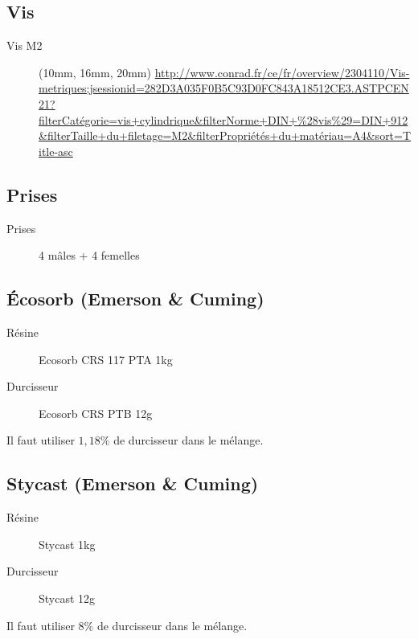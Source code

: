

\subsection{Vis}
\begin{description}
    \item[Vis M2] (10mm, 16mm, 20mm) \url{http://www.conrad.fr/ce/fr/overview/2304110/Vis-metriques;jsessionid=282D3A035F0B5C93D0FC843A18512CE3.ASTPCEN21?filterCatégorie=vis+cylindrique&filterNorme+DIN+%28vis%29=DIN+912&filterTaille+du+filetage=M2&filterPropriétés+du+matériau=A4&sort=Title-asc} 
\end{description}
\subsection{Prises}
\begin{description}
    \item[Prises \uD] 4 mâles + 4 femelles
\end{description}

\subsection{Écosorb (Emerson \& Cuming)}
\begin{description}
    \item[Résine] Ecosorb CRS 117 PTA 1kg
    \item[Durcisseur] Ecosorb CRS PTB 12g
\end{description}
Il faut utiliser $1,18\%$ de durcisseur dans le mélange.

\subsection{Stycast (Emerson \& Cuming)}
\begin{description}
    \item[Résine] Stycast  1kg
    \item[Durcisseur] Stycast  12g
\end{description}
Il faut utiliser $8\%$ de durcisseur dans le mélange.
